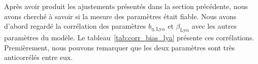 \documentclass[11pt, twoside, a4paper, openright]{report}
\begin{document}
Après avoir produit les ajustements présentés dans la section précédente, nous avons cherché à savoir si la mesure des paramètres \lya{} était fiable. Nous avons d'abord regardé la corrélation des paramètres $b_{\eta,\mathrm{Ly}\alpha}$ et $\beta_{\mathrm{Ly}\alpha}$ avec les autres paramètres du modèle. Le tableau~\ref{tab:corr_bias_lya} présente ces corrélations.
Premièrement, nous pouvons remarquer que les deux paramètres \lya{} sont très anticorrélés entre eux.
\end{document}
